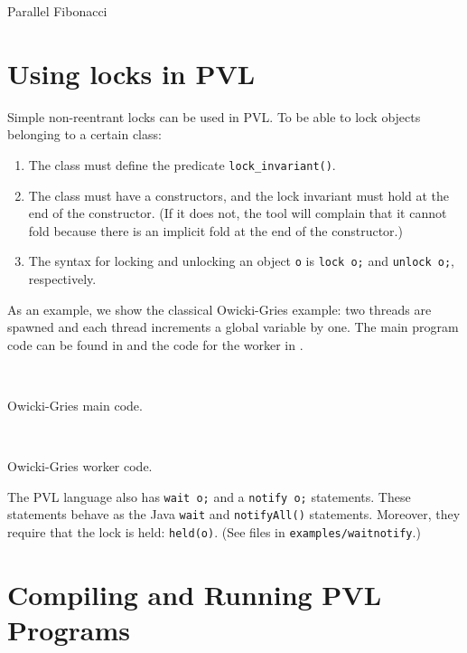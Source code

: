 \begin{listing}

\caption{Parallel Fibonacci}
\label{fibonacci}
\end{listing}

\section{Using locks in PVL}

Simple non-reentrant locks can be used in PVL.
To be able to lock objects belonging to a certain class:
\begin{enumerate}
\item The class must define the predicate \lstinline+lock_invariant()+.
\item The class must have a constructors, and the lock
invariant must hold at the end of the constructor. (If it does not, the tool
will complain that it cannot fold because there is an implicit fold at the end of the constructor.)
\item The syntax for locking and unlocking an object \lstinline+o+ is \lstinline+lock o;+
and \lstinline+unlock o;+, respectively.
\end{enumerate}


As an example, we show the classical Owicki-Gries example: two threads are spawned and each
thread increments a global variable by one. The main program code can be found in
 and the code for the worker in .

\begin{listing}
 
\caption{Owicki-Gries main code.}
\label{og main}
\end{listing}

\begin{listing}
 
\caption{Owicki-Gries worker code.}
\label{og worker}
\end{listing}

The PVL language also has \lstinline+wait o;+ and
a \lstinline+notify o;+ statements. These statements behave as the Java \lstinline+wait+
and \lstinline+notifyAll()+ statements. Moreover, they require that the lock is held:
\lstinline+held(o)+. (See files in \verb+examples/waitnotify+.)

\section{Compiling and Running PVL Programs}

